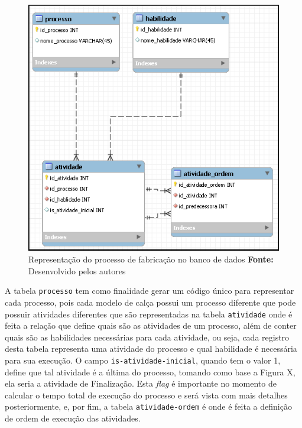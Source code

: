 \begin{figure}[h!]
	\centerline{\includegraphics[scale=0.7]{./imagens/representacao_processo.png}}
	\caption[Processo de fabricação]
	{Representação do processo de fabricação no banco de dados \textbf{Fonte:} Desenvolvido pelos autores}
	\label{fig:exemplo1}
\end{figure}

\par A tabela \texttt{processo} tem como finalidade gerar um código único para representar 
cada processo, pois cada modelo de calça possui um processo diferente que pode possuir atividades
diferentes que são representadas na tabela \texttt{atividade} onde é feita a relação que define quais são
as atividades de um processo,  além de conter quais são as habilidades necessárias para cada atividade, ou seja, cada registro desta 
tabela representa uma atividade do processo e qual habilidade é necessária para sua execução. O campo 
\texttt{is-atividade-inicial}, quando tem o valor 1, define que tal atividade é a última do processo, 
tomando como base a Figura X, ela seria a atividade de Finalização. Esta \textit{flag} é importante no momento de 
calcular o tempo total de execução do processo e será vista com mais detalhes posteriormente, e, por fim, a tabela 
\texttt{atividade-ordem} é onde é feita a definição de ordem de execução das atividades.


